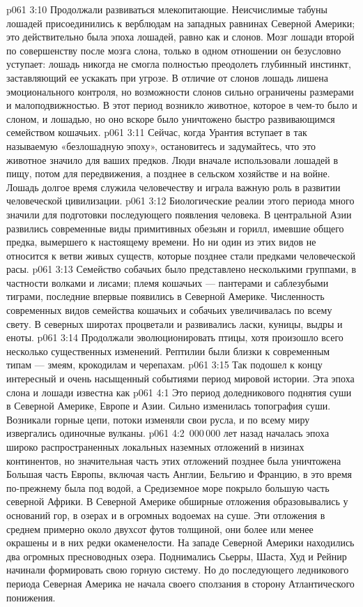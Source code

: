 \vs p061 3:10 Продолжали развиваться млекопитающие. Неисчислимые табуны лошадей присоединились к верблюдам на западных равнинах Северной Америки; это действительно была эпоха лошадей, равно как и слонов. Мозг лошади второй по совершенству после мозга слона, только в одном отношении он безусловно уступает: лошадь никогда не смогла полностью преодолеть глубинный инстинкт, заставляющий ее ускакать при угрозе. В отличие от слонов лошадь лишена эмоционального контроля, но возможности слонов сильно ограничены размерами и малоподвижностью. В этот период возникло животное, которое в чем\hyp{}то было и слоном, и лошадью, но оно вскоре было уничтожено быстро развивающимся семейством кошачьих.
\vs p061 3:11 \pc Сейчас, когда Урантия вступает в так называемую «безлошадную эпоху», остановитесь и задумайтесь, что это животное значило для ваших предков. Люди вначале использовали лошадей в пищу, потом для передвижения, а позднее в сельском хозяйстве и на войне. Лошадь долгое время служила человечеству и играла важную роль в развитии человеческой цивилизации.
\vs p061 3:12 \pc Биологические реалии этого периода много значили для подготовки последующего появления человека. В центральной Азии развились современные виды примитивных обезьян и горилл, имевшие общего предка, вымершего к настоящему времени. Но ни один из этих видов не относится к ветви живых существ, которые позднее стали предками человеческой расы.
\vs p061 3:13 Семейство собачьих было представлено несколькими группами, в частности волками и лисами; племя кошачьих --- пантерами и саблезубыми тиграми, последние впервые появились в Северной Америке. Численность современных видов семейства кошачьих и собачьих увеличивалась по всему свету. В северных широтах процветали и развивались ласки, куницы, выдры и еноты.
\vs p061 3:14 Продолжали эволюционировать птицы, хотя произошло всего несколько существенных изменений. Рептилии были близки к современным типам --- змеям, крокодилам и черепахам.
\vs p061 3:15 \pc Так подошел к концу интересный и очень насыщенный событиями период мировой истории. Эта эпоха слона и лошади известна как 
\vs p061 4:1 Это период доледникового поднятия суши в Северной Америке, Европе и Азии. Сильно изменилась топография суши. Возникали горные цепи, потоки изменяли свои русла, и по всему миру извергались одиночные вулканы.
\vs p061 4:2 \,000\,000 лет назад началась эпоха широко распространенных локальных наземных отложений в низинах континентов, но значительная часть этих отложений позднее была уничтожена Большая часть Европы, включая часть Англии, Бельгию и Францию, в это время по\hyp{}прежнему была под водой, а Средиземное море покрыло большую часть северной Африки. В Северной Америке обширные отложения образовывались у оснований гор, в озерах и в огромных водоемах на суше. Эти отложения в среднем примерно около двухсот футов толщиной, они более или менее окрашены и в них редки окаменелости. На западе Северной Америки находились два огромных пресноводных озера. Поднимались Сьерры, Шаста, Худ и Рейнир начинали формировать свою горную систему. Но до последующего ледникового периода Северная Америка не начала своего сползания в сторону Атлантического понижения.
